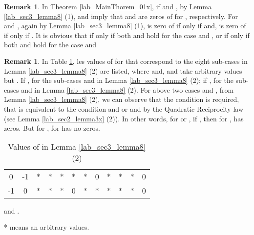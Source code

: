 \documentclass{mcom-l}
\theoremstyle{definition}
\newtheorem{sec3_remark2}[sec3_remark1]{Remark}
\newtheorem{sec3_remark3}[sec3_remark1]{Remark}
\numberwithin{equation}{section}
\begin{document}
     \begin{sec3_remark2}\label{Lab_sec3_remark2_A_thm2}
     In Theorem \ref{lab_MainThorem_01x}, if  and , by Lemma \ref{lab_sec3_lemma8} (1),  and  imply that  and  are zeros of   for , respectively. For  and , again by Lemma \ref{lab_sec3_lemma8} (1),  is zero of  if only if   and,  is zero of  if only if . It is obvious that  if only if both  and  hold for the case  and , or if only if both  and  hold for the case  and 
     \end{sec3_remark2}
     \begin{sec3_remark3}\label{Lab_sec3_remark3_A_thm2}
     In Table \ref{Lab_Table3_lemma8_2case2}, les values of  for  that correspond to the eight sub-cases in Lemma \ref{lab_sec3_lemma8} (2) are listed, where  and,   and  take arbitrary values but . If ,  for the sub-cases  and  in Lemma \ref{lab_sec3_lemma8} (2); if ,  for the sub-cases  and  in Lemma \ref{lab_sec3_lemma8} (2). For above two cases  and , from Lemma \ref{lab_sec3_lemma8} (2), we can observe that the condition  is required, that is equivalent to the condition  and  or  and  by the Quadratic Reciprocity law (see Lemma \ref{lab_sec2_lemma3x} (2)). In other words, for  or , if , then  for , has  zeros. But for ,  for  has no zeros.
     \end{sec3_remark3}
      \begin{table}[!t]
      \begin{threeparttable}[t]
        \renewcommand{\arraystretch}{1.3}
        \caption{Values of  in Lemma \ref{lab_sec3_lemma8}(2)
        \label{Lab_Table3_lemma8_2case2}}
        \centering
        \begin{tabular}{c|c|c|c|c|c|c|c|c|c|c|c}
        \hline
        &  &  &  &  &  &  &  &  &  &  & \\
        \hline
        0 & -1 & *\tnote{2} & * & * & * & * & 0 & * & * & * & 0\\
        \hline
        -1 & 0 & * & * & * &  0 & * & * & * & * & * & 0\\
        \hline
        \end{tabular}
         \begin{tablenotes}
              \item [1]  and .
              \item [2] * means an arbitrary values.
             
              \end{tablenotes}
        \end{threeparttable}
        \end{table}
\end{document}
